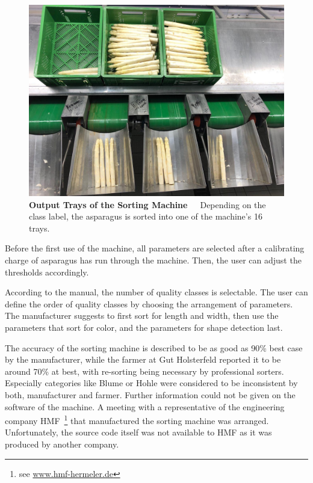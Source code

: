 \begin{figure}[!htb]
	\centering
	\includegraphics[scale=0.3]{Figures/chapter02/sorting_machine_slots.png}
	\decoRule
	\caption[Output Trays of the Sorting Machine]{\textbf{Output Trays of the Sorting Machine}~~~Depending on the class label, the asparagus is sorted into one of the machine's 16 trays.}
	\label{fig:SortingMachineSlots}
\end{figure}

Before the first use of the machine, all parameters are selected after a calibrating charge of asparagus has run through the machine. Then, the user can adjust the thresholds accordingly.

According to the manual, the number of quality classes is selectable. The user can define the order of quality classes by choosing the arrangement of parameters. The manufacturer suggests to first sort for length and width, then use the parameters that sort for color, and the parameters for shape detection last.

The accuracy of the sorting machine is described to be as good as 90\% best case by the manufacturer, while the farmer at Gut Holsterfeld reported it to be around 70\% at best, with re-sorting being necessary by professional sorters. Especially categories like Blume or Hohle were considered to be inconsistent by both, manufacturer and farmer. Further information could not be given on the software of the machine. A meeting with a representative of the engineering company HMF~\footnote{see \url{www.hmf-hermeler.de}}  that manufactured the sorting machine was arranged. Unfortunately, the source code itself was not available to HMF as it was produced by another company. 

